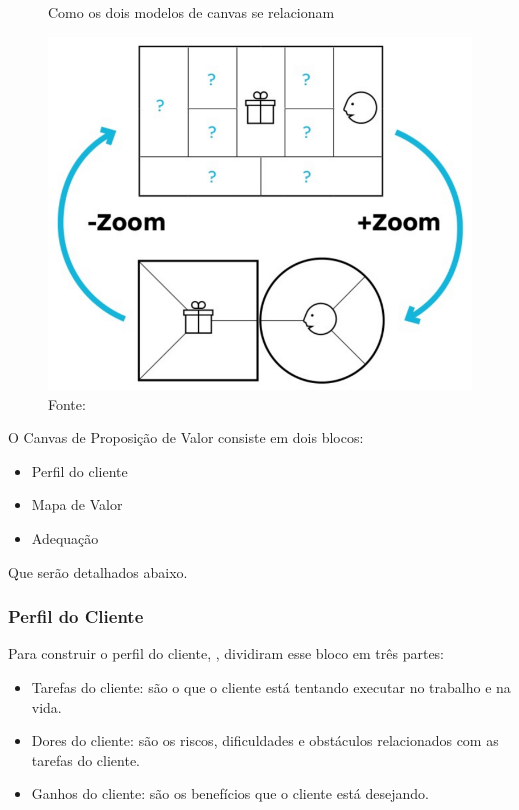 \begin{figure}[H]
\caption{Como os dois modelos de canvas se relacionam}
\centerline{\includegraphics[scale=0.25]{img/cross_canvas}}
\label{fig:cross_canvas}
\caption* {Fonte: }
\end{figure}

O Canvas de Proposição de Valor consiste em dois blocos:
\begin{itemize}
\item Perfil do cliente
\item Mapa de Valor
\item Adequação
\end{itemize}
Que serão detalhados abaixo.

\subsubsection{Perfil do Cliente}
\label{cha:perfil_do_cliente}
Para construir o perfil do cliente, , dividiram esse bloco em três partes:
\begin{itemize}
\item Tarefas do cliente: são o que o cliente está tentando executar no trabalho e na vida.
\item Dores do cliente: são os riscos, dificuldades e obstáculos relacionados com as tarefas do cliente.
\item Ganhos do cliente: são os benefícios que o cliente está desejando. \cite{valueproposition}
\end{itemize}


